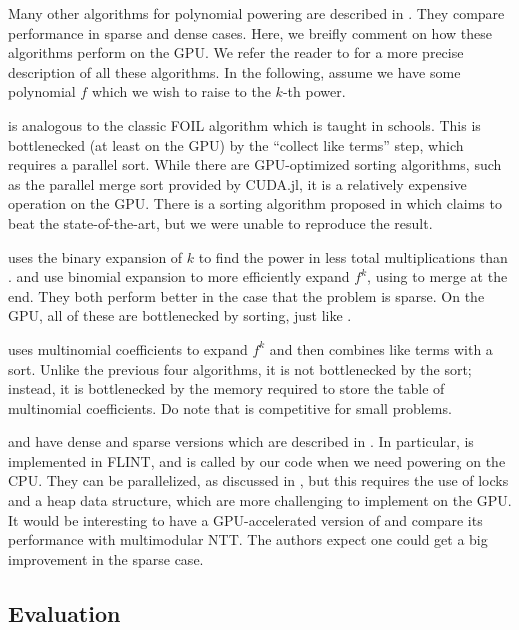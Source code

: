 Many other algorithms 
for polynomial powering
are described in \cite{monagan-2012-sparse-powering}. 
They compare performance in sparse and dense cases. 
Here, we breifly comment on how these algorithms perform on the GPU.
We refer the reader to \cite{monagan-2012-sparse-powering}
for a more precise description of all these algorithms.
In the following, assume we have some polynomial \(f\) which we wish 
to raise to the \(k\)-th power.

 is analogous to the classic FOIL algorithm which is taught in schools. 
This is bottlenecked (at least on the GPU) by the ``collect like terms'' step, 
which requires a parallel sort.
While there are GPU-optimized sorting algorithms, such as the parallel merge sort
provided by CUDA.jl, it is a relatively expensive operation on the GPU.
There is a sorting algorithm proposed in \cite{gupta-2023-gpu-sort}
which claims to beat the state-of-the-art, but we were unable to reproduce the result.

 uses the binary expansion of \(k\) to find the power in less
total multiplications than .
 and  use binomial expansion to more efficiently 
expand \(f^{k}\), using  to merge at the end.
They both perform better in the case that the problem is sparse.
On the GPU, all of these are bottlenecked by sorting, just like
.

 uses multinomial coefficients to expand \(f^{k}\) 
and then combines like terms with a sort. 
Unlike the previous four algorithms, it is not bottlenecked by the sort;
instead, it is bottlenecked by the memory required to store the table of
multinomial coefficients. Do note that  is 
competitive for small problems.

 and  have dense and sparse versions which are described in 
\cite{monagan-2012-sparse-powering}.
In particular,  is implemented in FLINT, and is called by our
code when we need powering on the CPU.
They can be parallelized, as discussed in \cite{monagan-2012-sparse-powering},
but this requires the use of locks and a heap data structure,
which are more challenging to implement on the GPU.
It would be interesting to have a GPU-accelerated version of
 and compare its performance with 
multimodular NTT.
The authors expect one could get a big improvement in the sparse case.

\subsection{Evaluation}

